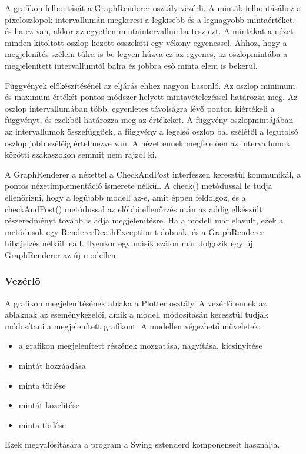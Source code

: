 A grafikon felbontását a GraphRenderer osztály vezérli. A minták felbontásához a pixeloszlopok intervallumán megkeresi a legkisebb és a legnagyobb mintaértéket, és ha ez van, akkor az egyetlen mintaintervallumba tesz ezt. A mintákat a nézet minden kitöltött oszlop között összeköti egy vékony egyenessel. Ahhoz, hogy a megjelenítés szélein túlra is be legyen húzva ez az egyenes, az oszlopmintába a megjelenített intervallumtól balra és jobbra eső minta elem is bekerül.

Függvények előkészítésénél az eljárás ehhez nagyon hasonló.
Az oszlop minimum és maximum értékét pontos módszer helyett mintavételezéssel határozza meg. Az oszlop intervallumában több, egyenletes távolságra lévő ponton kiértékeli a függvényt, és ezekből határozza meg az értékeket.
A függvény oszlopmintájában az intervallumok összefüggőek, a függvény a legelső oszlop bal szélétől a legutolsó oszlop jobb széléig értelmezve van. A nézet ennek megfelelően az intervallumok közötti szakaszokon semmit nem rajzol ki.

A GraphRenderer a nézettel a CheckAndPost interfészen keresztül kommunikál, a pontos nézetimplementáció ismerete nélkül. A check() metódussal le tudja ellenőrizni, hogy a legújabb modell az-e, amit éppen feldolgoz, és a checkAndPost() metódussal az előbbi ellenőrzés után az addig elkészült részeredményt tovább is adja megjelenítésre.
Ha a modell már elavult, ezek a metódusok egy RendererDeathException-t dobnak, és a GraphRenderer hibajelzés nélkül leáll. Ilyenkor egy másik szálon már dolgozik egy új GraphRenderer az új modellen.

\subsubsection{Vezérlő}

A grafikon megjelenítésének ablaka a Plotter osztály.
A vezérlő ennek az ablaknak az eseménykezelői, amik a modell módosításán keresztül tudják módosítani a megjelenített grafikont.
A modellen végezhető műveletek:
\begin{itemize}
\item a grafikon megjelenített részének mozgatása, nagyítása, kicsinyítése
\item mintát hozzáadása
\item minta törlése
\item mintát közelítése
\item minta törlése
\end{itemize}
Ezek megvalósítására a program a Swing sztenderd komponenseit használja.

